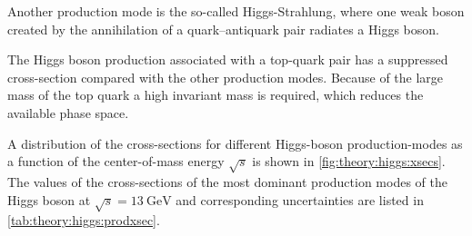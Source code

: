 Another production mode is the so-called Higgs-Strahlung, where one weak boson created by the annihilation of
a quark--antiquark pair radiates a Higgs boson.

The Higgs boson production associated with a top-quark pair has a suppressed cross-section compared with the
other production modes.
Because of the large mass of the top quark a high invariant mass is required, which reduces the available phase space.

A distribution of the cross-sections for different Higgs-boson production-modes as a function of the center-of-mass
energy $\sqrt{s}$ is shown in \cref{fig:theory:higgs:xsecs}.
The values of the cross-sections of the most dominant production modes of the Higgs boson at $\sqrt{s} = \SI{13}{\GeV}$
and corresponding uncertainties are listed in \cref{tab:theory:higgs:prodxsec}.

